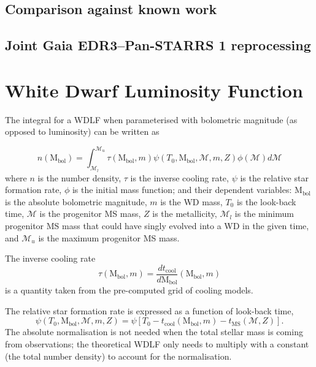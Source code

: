 \documentclass[fleqn,usenatbib]{rasti}
\begin{document}
\subsection{Comparison against known work}


\subsection{Joint Gaia EDR3--Pan-STARRS 1 reprocessing}


\section{White Dwarf Luminosity Function}
The integral for a WDLF when parameterised with bolometric magnitude (as
opposed to luminosity) can be written as

\begin{equation}
    n(\mathrm{M}_{\mathrm{bol}}) = \int_{\mathcal{M}_l}^{\mathcal{M}_u} \tau(\mathrm{M}_\mathrm{bol}, m) \psi(T_0, \mathrm{M}_\mathrm{bol}, \mathcal{M}, m, Z) \phi(\mathcal{M}) d\mathcal{M}
\end{equation}
where $n$ is the number density, $\tau$ is the inverse cooling rate, $\psi$ is
the relative star formation rate, $\phi$ is the initial mass function; and their
dependent variables: $\mathrm{M}_\mathrm{bol}$ is the absolute bolometric
magnitude, $m$ is the WD mass, $T_0$ is the look-back time, $\mathcal{M}$ is
the progenitor MS mass, $Z$ is the metallicity, $\mathcal{M}_l$ is the minimum
progenitor MS mass that could have singly evolved into a WD in the given time,
and $\mathcal{M}_u$ is the maximum progenitor MS mass.

The inverse cooling rate
\begin{equation}
    \tau(\mathrm{M}_\mathrm{bol}, m) = \dfrac{dt_{\mathrm{cool}}}{d\mathrm{M}_\mathrm{bol}} \left( \mathrm{M}_\mathrm{bol}, m \right)
\end{equation}
is a quantity taken from the pre-computed grid of cooling models. 

The relative star formation rate is expressed as a function of look-back time,
\begin{equation}
    \psi(T_0, \mathrm{M}_\mathrm{bol}, \mathcal{M}, m, Z) = \psi\left[T_0 - t_{\mathrm{cool}}\left(\mathrm{M}_\mathrm{bol}, m\right) - t_{\mathrm{MS}}\left(\mathcal{M}, Z\right)\right].
\end{equation}
The absolute normalisation is not needed when the total stellar mass is coming
from observations; the theoretical WDLF only needs to multiply with a
constant (the total number density) to account for the normalisation.
\end{document}
